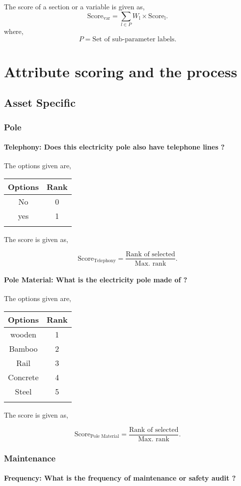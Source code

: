 \documentclass[oneside,twocolumn]{article}
\newcommand{\tsub}[2]{\text{#1}_{\text{#2}}}
\newcommand{\tsubb}[2]{#1_{\text{#2}}}
\newcommand{\dsub}[2]{\dfrac{\text{#1}}{\text{#2}}}
\newcommand{\singsel}[1]
{
	\[
		\tsub{Score}{#1} = \dsub{Rank of selected}{Max. rank}.
	\]
}
\newenvironment{ttable}
{
\begin{center}
\begin{tabular}{c|c}
\hline
}
{
\\ \hline
\end{tabular}
\end{center}
}
\begin{document}
The score of a section or a variable is given as,
\[
	\tsub{Score}{var} = \sum_{l \in P} \tsubb{W}{l} \times \tsub{Score}{l}.
\]
where,
\[
	P = \text{Set of sub-parameter labels.}
\]
\section{Attribute scoring and the
process}
\subsection{Asset Specific}
\subsubsection{Pole}

\paragraph{Telephony: Does this electricity pole also have telephone lines ?}

The options given are,
\begin{ttable}
Options & Rank \\ \hline
No & 0 \\
yes & 1 \\
\hline
\end{ttable}
The score is given as,
\singsel{Telephony}
\paragraph{Pole Material: What is the electricity pole made of ?}

The options given are,
\begin{ttable}
Options & Rank \\ \hline
wooden & 1 \\
Bamboo & 2 \\
Rail & 3 \\
Concrete & 4 \\
Steel & 5 \\
\hline
\end{ttable}
The score is given as,
\singsel{Pole Material}
\subsubsection{Maintenance}

\paragraph{Frequency: What is the frequency of  maintenance or safety audit ?}
\end{document}
